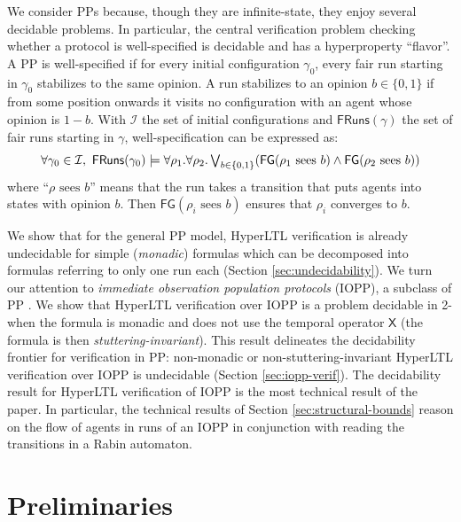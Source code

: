 \documentclass[10pt,a4paper]{article}
\newcommand{\set}[1]{\{#1\}}
\newcommand{\fairrunsfrom}[1]{\mathsf{FRuns}(#1)}
\newcommand{\config}{\gamma}
\newcommand{\run}{\rho}
\newcommand{\initial}{\mathcal{I}}   %
\newcommand{\ltlnext}{\mathsf{X}}
\newcommand{\ltlglobally}{\mathsf{G}}
\newcommand{\ltlfinally}{\mathsf{F}}
\newcommand{\modelsHLTL}{\ensuremath{\models}}
\begin{document}
We consider PPs because, though they are infinite-state, they enjoy several decidable problems.
In particular, the central verification problem checking whether a protocol is well-specified is decidable \cite{EGLM17journal} and has a hyperproperty ``flavor''.
%
A PP is well-specified if for every initial configuration \(\config_0\), every fair run starting in \(\config_0\) stabilizes to the same opinion.
A run stabilizes to an opinion \(b \in \set{0,1}\) if from some position onwards it visits no configuration with an agent whose opinion is \(1-b\).
With \(\initial\) the set of initial configurations and \(\fairrunsfrom{\config}\) the set of fair runs starting in \(\config\), well-specification can be expressed as: \[\forall \config_0 \in \initial, \ \fairrunsfrom{\config_0} \modelsHLTL \forall \run_1.
	\forall \run_2 \ldotp \textstyle{\bigvee_{b \in \set{0,1}}} (\ltlfinally \ltlglobally (\run_1 \text{ sees } b) \land \ltlfinally \ltlglobally(\run_2 \text{ sees } b))\]
where ``\(\run \text{ sees } b\)'' means that the run takes a transition
that puts agents into states with opinion \(b\).
Then \(\ltlfinally \ltlglobally (\run_i \text{ sees } b)\) ensures that \(\run_i\) converges to \(b\).

We show that for the general PP model, HyperLTL verification is already undecidable for simple (\emph{monadic}) formulas which can be decomposed into formulas referring to only one run each (Section \ref{sec:undecidability}).
%
We turn our attention to \emph{immediate observation population protocols} (IOPP), a subclass of PP \cite{Comp-Power-Pop-Prot}.
We show that HyperLTL verification over IOPP is a problem decidable in 2-\EXPSPACE when the formula is monadic and does not use the temporal operator \(\ltlnext\) (the formula is then \emph{stuttering-invariant}).
This result delineates the decidability frontier for verification in PP: non-monadic or non-stuttering-invariant HyperLTL verification over IOPP is undecidable (Section \ref{sec:iopp-verif}).
%
The decidability result for HyperLTL verification of IOPP is the most technical result of the paper.
In particular, the technical results of Section \ref{sec:structural-bounds} reason on the flow of agents in runs of an IOPP in conjunction with reading the transitions in a Rabin automaton.

%

%
%
%
%
%
%
%
%
%
%
%
%
%
%
%
%

%
%
%
\section{Preliminaries}
\end{document}
